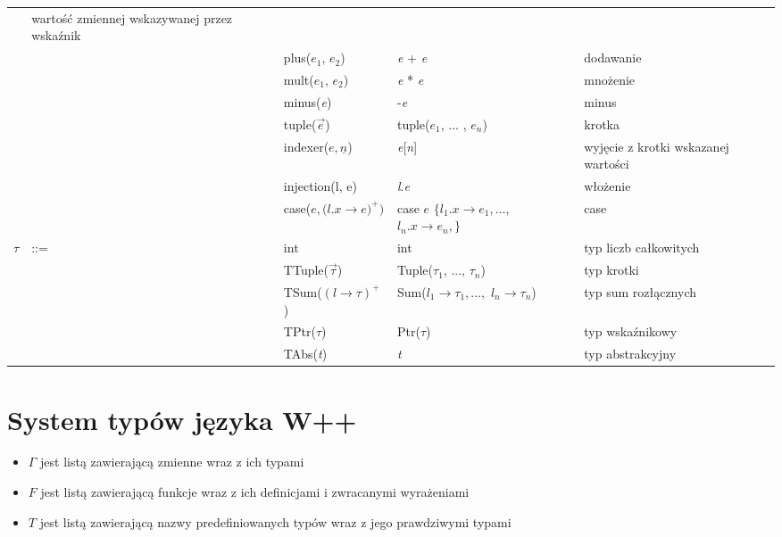 \documentclass{article}
\begin{document}
\begin{table}[H]
\begin{tabular}{lllp{3.5cm}p{5.6cm}}
           & wartość zmiennej wskazywanej przez wskaźnik \\
                    &     & plus($e_1$, $e_2$)                                                  & \emph{e} + \emph{e}
           & dodawanie \\
                    &     & mult($e_1$, $e_2$)                                                  & \emph{e} * \emph{e}
           & mnożenie \\
                    &     & minus(\emph{e})                                                      & -\emph{e}
           & minus \\
                    &     & tuple(\begin{math}\Vec{e}\end{math})                          & tuple($e_1$, ... , $e_n$) & krotka \\
                    &     & indexer($e, \underline{n}$)                                               & \emph{e}[\emph{n}]     
          & wyjęcie z krotki wskazanej wartości \\
                    &     & injection(l, e)                                               & \emph{l}.\emph{e}
          & włożenie\\
                    &     & case(${e, (l.x}\rightarrow e)^{+})$                           & case $e$ $\{ l_1. x\rightarrow e_1, ...,$ $ l_n. x \rightarrow e_n, \} $    
          & case\\
        $ \tau $    & ::= & int                                                           & int 
          & typ liczb całkowitych \\
                    &     & TTuple($\Vec{\tau}$)                                           & Tuple($\tau_1$, ...,  $\tau_n$) 
          & typ krotki \\
                    &     & TSum($ (l \rightarrow \tau)^{+}$)                              & Sum($ l_1\rightarrow\tau_1, ...,$ $ l_n\rightarrow\tau_n$)
                     & typ sum rozłącznych \\
                    &     & TPtr($\tau$)                                                   & Ptr($\tau$) 
          & typ wskaźnikowy \\
                    &     & TAbs(\emph{t}) & \emph{t} 
          & typ abstrakcyjny \\
    \end{tabular}
\end{table}
\newpage
\section{System typów języka W++}
\begin{itemize}
    \item $\Gamma$ jest listą zawierającą zmienne wraz z ich typami
    \item $F$ jest listą zawierającą funkcje wraz z ich definicjami i zwracanymi wyrażeniami 
    \item $T$ jest listą zawierającą nazwy predefiniowanych typów wraz z jego prawdziwymi typami
\end{itemize}
\end{document}
